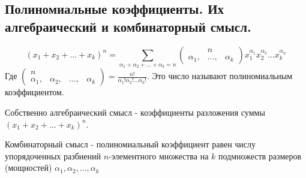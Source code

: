 \subsection{Полиномиальные коэффициенты. Их алгебраический и комбинаторный смысл.}
$$(x_1 + x_2 + ... + x_k)^n = \sum_{\alpha_1+\alpha_2+...+\alpha_k=n}\begin{pmatrix}&n\\\alpha_1,&...,&\alpha_k\end{pmatrix}x_1^{\alpha_1}x_2^{\alpha_2}...x_k^{\alpha_n}$$
Где $\begin{pmatrix}n\\\alpha_1,&\alpha_2,&...,&\alpha_k\end{pmatrix} = \frac{n!}{\alpha_1!\alpha_2!...\alpha_k!}$. Это число называют полиномиальным коэффициентом. 

Собственно алгебраический смысл - коэффициенты разложения суммы $(x_1 + x_2 + ... + x_k)^n$.

Комбинаторный смысл - полиномиальный коэффициент равен числу упорядоченных разбиений $n$-элементного множества на $k$ подмножеств размеров (мощностей) $\alpha_1, \alpha_2,...,\alpha_k$